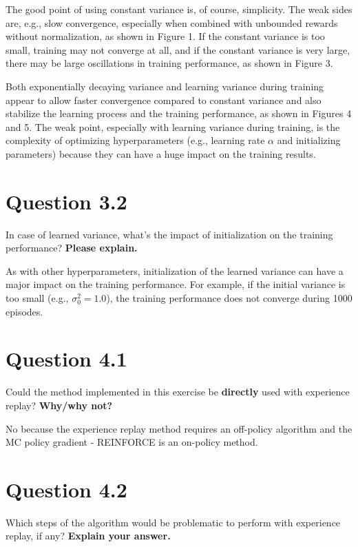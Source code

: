 \documentclass[12pt]{article}
\begin{document}
The good point of using constant variance is, of course, simplicity. The weak sides are, e.g., slow convergence, especially when combined with unbounded rewards without normalization, as shown in Figure 1. If the constant variance is too small, training may not converge at all, and if the constant variance is very large, there may be large oscillations in training performance, as shown in Figure 3. 
\newline 

Both exponentially decaying variance and learning variance during training appear to allow faster convergence compared to constant variance and also stabilize the learning process and the training performance, as shown in Figures 4 and 5. The weak point, especially with learning variance during training, is the complexity of optimizing  hyperparameters (e.g., learning rate $\alpha$ and initializing parameters) because they can have a huge impact on the training results.


\section*{Question 3.2}

In case of learned variance, what’s the impact of initialization on the
training performance? \textbf{Please explain.}
\newline

As with other hyperparameters, initialization of the learned variance can have a major impact on the training performance. For example, if the initial variance is too small (e.g., $\sigma_0^2 = 1.0$), the training performance does not converge during 1000 episodes.


\section*{Question 4.1}

Could the method implemented in this exercise be \textbf{directly} used
with experience replay? \textbf{Why/why not?}
\newline 

No because the experience replay method requires an off-policy algorithm and the MC policy gradient - REINFORCE is an on-policy method.


\section*{Question 4.2}

Which steps of the algorithm would be problematic to perform with
experience replay, if any? \textbf{Explain your answer.}
\newline
\end{document}
